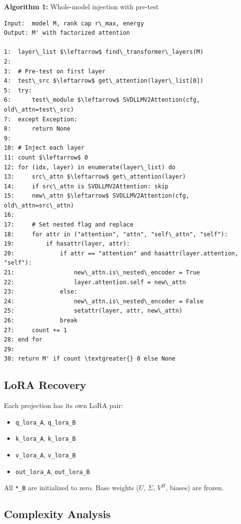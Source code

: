 \textbf{Algorithm 1:} Whole-model injection with pre-test
\begin{lstlisting}
Input:  model M, rank cap r\_max, energy  
Output: M' with factorized attention

1:  layer\_list $\leftarrow$ find\_transformer\_layers(M)
2:
3:  # Pre-test on first layer
4:  test\_src $\leftarrow$ get\_attention(layer\_list[0])
5:  try:
6:      test\_module $\leftarrow$ SVDLLMV2Attention(cfg, old\_attn=test\_src)
7:  except Exception:
8:      return None
9:
10: # Inject each layer
11: count $\leftarrow$ 0
12: for (idx, layer) in enumerate(layer\_list) do
13:     src\_attn $\leftarrow$ get\_attention(layer)
14:     if src\_attn is SVDLLMV2Attention: skip
15:     new\_attn $\leftarrow$ SVDLLMV2Attention(cfg, old\_attn=src\_attn)
16:
17:     # Set nested flag and replace
18:     for attr in ("attention", "attn", "self\_attn", "self"):
19:         if hasattr(layer, attr):
20:             if attr == "attention" and hasattr(layer.attention, "self"):
21:                 new\_attn.is\_nested\_encoder = True
22:                 layer.attention.self = new\_attn
23:             else:
24:                 new\_attn.is\_nested\_encoder = False
25:                 setattr(layer, attr, new\_attn)
26:             break
27:     count += 1
28: end for
29:
30: return M' if count \textgreater{} 0 else None
\end{lstlisting}

\subsection{LoRA Recovery}

Each projection has its own LoRA pair:

\begin{itemize}
\item \texttt{q\_lora\_A}, \texttt{q\_lora\_B}
\item \texttt{k\_lora\_A}, \texttt{k\_lora\_B}
\item \texttt{v\_lora\_A}, \texttt{v\_lora\_B}
\item \texttt{out\_lora\_A}, \texttt{out\_lora\_B}

\end{itemize}
All \texttt{*\_B} are initialized to zero. Base weights ($U$, $\Sigma$, $V^H$, biases) 
are frozen.

\subsection{Complexity Analysis}

